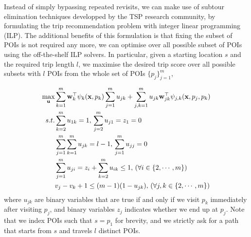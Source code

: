 



Instead of simply bypassing repeated revisits, 
we can make use of subtour elimination techniques developped by the TSP research community,
by formulating the trip recommendation problem with integer linear programming (ILP).
The additional benefits of this formulation is that fixing the subset of POIs is not required any more,
we can optimise over all possible subset of POIs using the off-the-shelf ILP solvers.
In particular, given a starting location $s$ and the required trip length $l$,
we maximise the desired trip score over all possible subsets with $l$ POIs from the whole set of POIs $\{p_j\}_{j=1}^m$, \ie

\begin{align*}
\max_{\bu} & \sum_{k=1}^m \w_k^\top \psi_k(\x, p_k) \sum_{j=1}^m u_{jk} +
             \sum_{j,k=1}^m u_{jk} \w_{jk}^\top \psi_{j, k}(\x, p_j, p_k) \\
s.t. 
& \sum_{k=2}^m u_{1k} = 1, \, \sum_{j=2}^m u_{j1} = z_1=0  \\                %
& \sum_{j=1}^m \sum_{k=1}^m u_{jk} = l-1, \, \sum_{j=1}^m u_{jj}=0  \\      %
& \sum_{j=1}^m u_{ji} = z_i + \sum_{k=2}^m u_{ik} \le 1, \, (\forall i \in \{2,\cdots,m\})  \\ %
& v_j - v_k + 1 \le (m-1) (1-u_{jk}), \, (\forall j,k \in \{2,\cdots,m\})                 %
\end{align*}
where $u_{jk}$ are binary variables that are true if and only if
we visit $p_k$ immediately after visiting $p_j$,
and binary variables $z_j$ indicates whether we end up at $p_j$.
Note that we index POIs such that $s = p_1$ for brevity,
and we strictly ask for a path that starts from $s$ and travels $l$ distinct POIs.
